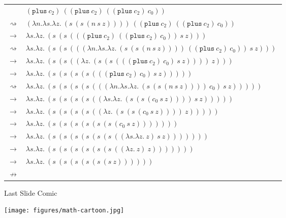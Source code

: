 \documentclass[11pt]{beamer}
\begin{document}
\begin{frame}[fragile=singleslide]{}
\begin{center}
\begin{tabular}{c l}
& $(\texttt{plus}\:c_2)\:((\texttt{plus}\:c_2)\:((\texttt{plus}\:c_2)\:c_0))$ \\ 
$\rightsquigarrow$ & $(\lambda n. \lambda s. \lambda z.\:(s\:(s\:(n\:s\:z))))\:((\texttt{plus}\:c_2)\:((\texttt{plus}\:c_2)\:c_0))$ \\ 
$\rightarrow$ & $\lambda s. \lambda z.\:(s\:(s\:(((\texttt{plus}\:c_2)\:((\texttt{plus}\:c_2)\:c_0))\:s\:z)))$ \\ 
$\rightsquigarrow$ & $\lambda s. \lambda z.\:(s\:(s\:(((\lambda n. \lambda s. \lambda z.\:(s\:(s\:(n\:s\:z))))\:((\texttt{plus}\:c_2)\:c_0))\:s\:z)))\:$ \\ 
$\rightarrow$ & $\lambda s. \lambda z.\:(s\:(s\:((\lambda z.\:(s\:(s\:(((\texttt{plus}\:c_2)\:c_0)\:s\:z))))\:z)))\:$ \\ 
$\rightarrow$ & $\lambda s. \lambda z.\:(s\:(s\:(s\:(s\:(((\texttt{plus}\:c_2)\:c_0)\:s\:z)))))$ \\ 
$\rightsquigarrow$ & $\lambda s. \lambda z.\:(s\:(s\:(s\:(s\:(((\lambda n. \lambda s. \lambda z.\:(s\:(s\:(n\:s\:z))))\:c_0)\:s\:z)))))$ \\ 
$\rightarrow$ & $\lambda s. \lambda z.\:(s\:(s\:(s\:(s\:((\lambda s. \lambda z.\:(s\:(s\:(c_0\:s\:z))))\:s\:z)))))$ \\ 
$\rightarrow$ & $\lambda s. \lambda z.\:(s\:(s\:(s\:(s\:((\lambda z.\:(s\:(s\:(c_0\:s\:z))))\:z)))))$ \\ 
$\rightarrow$ & $\lambda s. \lambda z.\:(s\:(s\:(s\:(s\:(s\:(s\:(c_0\:s\:z)))))))$ \\
$\rightarrow$ & $\lambda s. \lambda z.\:(s\:(s\:(s\:(s\:(s\:(s\:((\lambda s. \lambda z.\:z)\:s\:z)))))))$ \\
$\rightarrow$ & $\lambda s. \lambda z.\:(s\:(s\:(s\:(s\:(s\:(s\:((\lambda z.\:z)\:z)))))))$ \\
$\rightarrow$ & $\lambda s. \lambda z.\:(s\:(s\:(s\:(s\:(s\:(s\:z))))))$ \\
$\nrightarrow$ & \\
\end{tabular}
\end{center}

\end{frame}

\begin{frame}[fragile=singleslide]{Last Slide Comic}
\begin{center}
\texttt{[image: figures/math-cartoon.jpg]}
\end{center}
\end{frame}
\end{document}
